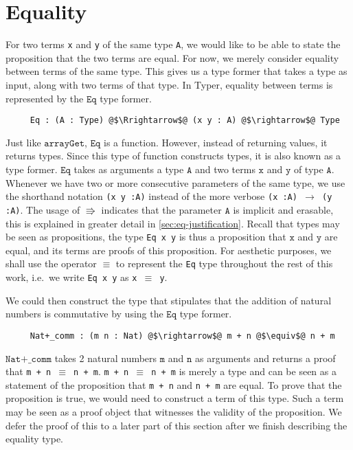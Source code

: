 \documentclass[12pt,twoside,maitrise]{dms}
\theoremstyle{definition}
\numberwithin{equation}{section}
\numberwithin{table}{chapter}
\numberwithin{figure}{chapter}
\newcommand\id[1] {\texttt{#1}}
\newcommand\fn[1] {\texttt{#1}}
\begin{document}
\section{Equality}\label{sec:intro-eq}

For two terms \id{x} and \id{y} of the same type \id{A}, we would like to be
able to state the proposition that the two terms are equal. For now, we merely
consider equality between terms of the same type. This gives us a type former
that takes a type as input, along with two terms of that type. In Typer,
equality between terms is represented by the $\id{Eq}$ type former.

\begin{verbatim}
     Eq : (A : Type) @$\Rrightarrow$@ (x y : A) @$\rightarrow$@ Type
\end{verbatim}

Just like $\id{arrayGet}$, $\id{Eq}$ is a function. However, instead of
returning values, it returns types. Since this type of function constructs
types, it is also known as a type former. $\id{Eq}$ takes as arguments a type
$\id{A}$ and two terms $\id{x}$ and $\id{y}$ of type $\id{A}$. Whenever we have
two or more consecutive parameters of the same type, we use the shorthand
notation \fn{(x y :\@ A)} instead of the more verbose \fn{(x :\@ A)
  $\rightarrow$ (y :\@ A)}. The usage of $\Rrightarrow$ indicates that the
parameter $\id{A}$ is implicit and erasable, this is explained in greater detail
in \autoref{sec:eq-justification}. Recall that types may be seen as
propositions, the type \fn{Eq x y} is thus a proposition that $\fn{x}$ and
$\fn{y}$ are equal, and its terms are proofs of this proposition. For aesthetic
purposes, we shall use the operator $\equiv$ to represent the \id{Eq} type
throughout the rest of this work, i.e.\ we write \fn{Eq x y} as \fn{x $\equiv$
  y}.

We could then construct the type that stipulates that the addition of natural
numbers is commutative by using the $\id{Eq}$ type former.

\begin{verbatim}
     Nat+_comm : (m n : Nat) @$\rightarrow$@ m + n @$\equiv$@ n + m
\end{verbatim}

$\fn{Nat+\_comm}$ takes 2 natural numbers $\fn{m}$ and $\fn{n}$ as arguments and
returns a proof that \fn{m + n $\equiv$ n + m}. \fn{m + n $\equiv$ n + m} is
merely a type and can be seen as a statement of the proposition that \fn{m + n}
and \fn{n + m} are equal. To prove that the proposition is true, we would need
to construct a term of this type. Such a term may be seen as a proof object that
witnesses the validity of the proposition. We defer the proof of this to a later
part of this section after we finish describing the equality type.
\end{document}
